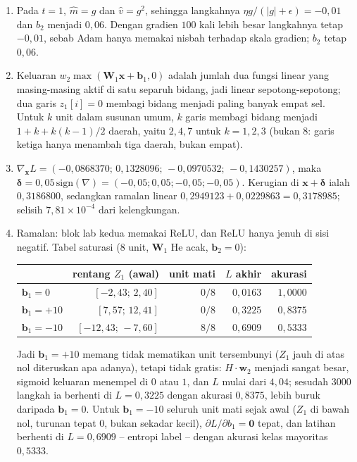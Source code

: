 \begin{enumerate}[label=\textbf{25.\arabic*}]
  \item Pada $t=1$, $\hat m=g$ dan $\hat v=g^{2}$, sehingga langkahnya
        $\eta g/(|g|+\epsilon)=-0{,}01$ dan $b_{2}$ menjadi $0{,}06$. Dengan gradien
        $100$ kali lebih besar langkahnya tetap $-0{,}01$, sebab Adam hanya
        memakai nisbah terhadap skala gradien; $b_{2}$ tetap $0{,}06$.

  \item 
Keluaran $w_{2}\max(\mathbf{W}_{1}\mathbf{x}+\mathbf{b}_{1},0)$ adalah
        jumlah dua fungsi linear yang masing-masing aktif di satu separuh bidang,
        jadi linear sepotong-sepotong; dua garis $z_{1}[i]=0$ membagi bidang menjadi
        paling banyak empat sel. Untuk $k$ unit dalam susunan umum, $k$ garis
        membagi bidang menjadi $1+k+k(k-1)/2$ daerah, yaitu $2,4,7$ untuk $k=1,2,3$
        (bukan $8$: garis ketiga hanya menambah tiga daerah, bukan empat).

  \item $\nabla_{\mathbf{x}}L=(-0{,}0868370;\,0{,}1328096;\,-0{,}0970532;\,
        -0{,}1430257)$, maka $\boldsymbol{\delta}=0{,}05\,\mathrm{sign}(\nabla)
        =(-0{,}05;0{,}05;-0{,}05;-0{,}05)$. Kerugian di $\mathbf{x}+\boldsymbol{\delta}$
        ialah $0{,}3186800$, sedangkan ramalan linear
        $0{,}2949123+0{,}0229863=0{,}3178985$; selisih $7{,}81\times10^{-4}$ dari
        kelengkungan.

  \item 
Ramalan: blok lab kedua memakai ReLU, dan ReLU hanya jenuh di sisi negatif.
        Tabel saturasi ($8$ unit, $\mathbf{W}_{1}$ He acak, $\mathbf{b}_{2}=0$):
        \begin{center}
        \begin{tabular}{lrrrr}
        & rentang $Z_{1}$ (awal) & unit mati & $L$ akhir & akurasi \\ \hline
        $\mathbf{b}_{1}=0$   & $[-2{,}43;\,2{,}40]$   & $0/8$ & $0{,}0163$ & $1{,}0000$ \\
        $\mathbf{b}_{1}=+10$ & $[7{,}57;\,12{,}41]$   & $0/8$ & $0{,}3225$ & $0{,}8375$ \\
        $\mathbf{b}_{1}=-10$ & $[-12{,}43;\,-7{,}60]$ & $8/8$ & $0{,}6909$ & $0{,}5333$
        \end{tabular}
        \end{center}
        Jadi $\mathbf{b}_{1}=+10$ memang tidak mematikan unit tersembunyi
        ($Z_{1}$ jauh di atas nol diteruskan apa adanya), tetapi tidak gratis:
        $H\cdot\mathbf{w}_{2}$ menjadi sangat besar, sigmoid keluaran menempel di
        $0$ atau $1$, dan $L$ mulai dari $4{,}04$; sesudah $3000$ langkah ia
        berhenti di $L=0{,}3225$ dengan akurasi $0{,}8375$, lebih buruk daripada
        $\mathbf{b}_{1}=0$. Untuk $\mathbf{b}_{1}=-10$ seluruh unit mati sejak awal
        ($Z_{1}$ di bawah nol, turunan tepat $0$, bukan sekadar kecil),
        $\partial L/\partial b_{1}=\mathbf{0}$ tepat, dan latihan berhenti di
        $L=0{,}6909$ -- entropi label -- dengan akurasi kelas mayoritas $0{,}5333$.
  \end{enumerate}

